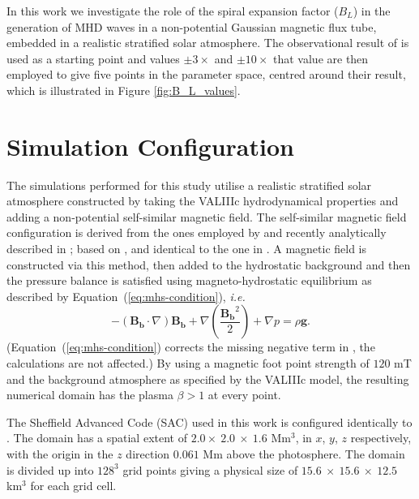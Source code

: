 In this work we investigate the role of the spiral expansion factor ($B_L$) in the generation of MHD waves in a non-potential Gaussian magnetic flux tube, embedded in a realistic stratified solar atmosphere.
The observational result of \cite{Bonet2008} is used as a starting point and values $\pm 3\times$ and $\pm 10\times$ that value are then employed to give five points in the parameter space, centred around their result, which is illustrated in Figure \ref{fig:B_L_values}.


\section{Simulation Configuration}\label{sec:simconfig}
The simulations performed for this study utilise a realistic stratified solar atmosphere constructed by taking the VALIIIc \citep{vernazza1981} hydrodynamical properties and adding a non-potential self-similar magnetic field.
The self-similar magnetic field configuration is derived from the ones employed by \citet{fedun2011} and recently analytically described in \cite{gent2013, gent2014}; based on \citet{schluter1958, deinzer1965, low1980, Schussler2005}, and identical to the one in \cite{Mumford2015}.
A magnetic field is constructed via this method, then added to the hydrostatic background and then the pressure balance is satisfied using magneto-hydrostatic equilibrium as described by Equation~(\ref{eq:mhs-condition}), \textit{i.e.}
\begin{equation}
-(\mathbf{B_b}\cdot \nabla)\mathbf{B_b} + \nabla\left(\frac{\mathbf{B_b}^2}{2}\right) + \nabla p = \rho\mathbf{g}.
\label{eq:mhs-condition}
\end{equation}
(Equation~(\ref{eq:mhs-condition}) corrects the missing negative term in \cite{Mumford2015}, the calculations are not affected.)
By using a magnetic foot point strength of $120$ mT and the background atmosphere as specified by the VALIIIc model, the resulting numerical domain has the plasma $\beta > 1$ at every point.

The Sheffield Advanced Code (SAC) \citep{Shelyag2008} used in this work is configured identically to \cite{Mumford2015}. The domain has a spatial extent of $2.0 \times\ 2.0\ \times\ 1.6$ Mm$^3$, in $x$, $y$, $z$ respectively, with the origin in the $z$ direction $0.061$ Mm above the photosphere. The domain is divided up into $128^3$ grid points giving a physical size of $15.6\ \times\ 15.6\ \times\ 12.5$ km$^3$ for each grid cell.

